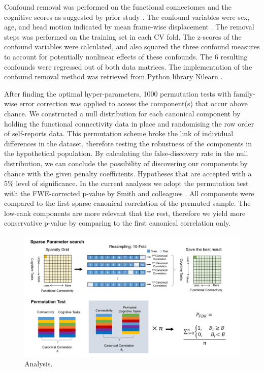 Confound removal was performed on the functional connectomes and the cognitive scores as suggested by prior study \cite{Smith2015}.
The confound variables were sex, age, and head motion indicated by mean frame-wise displacement \cite{Jenkinson2002}.
The  removal  steps  was  performed  on  the training set in each CV fold. The z-scores of the confound variables were calculated, and also squared the three confound measures to account for potentially nonlinear effects of these confounds. The 6 resulting confounds were regressed out of both data matrices.
The implementation of the confound removal method \cite{Friston1994} was retrieved from Python library Nilearn \cite[ \url{http://nilearn.github.io/}, version 0.3.1]{Abraham2014}.

After finding the optimal hyper-parameters, 1000 permutation tests with family-wise error correction was applied to access the component(s) that occur above chance. We constructed a null distribution for each canonical component by holding the functional connectivity data in place and randomising the row order of self-reports data. This permutation scheme broke the link of individual differences in the dataset, therefore testing the robustness of the components in the hypothetical population. By calculating the false-discovery rate in the null distribution, we can conclude the possibility of discovering our components by chance with the given penalty coefficients. Hypotheses that are accepted with a 5\% level of significance. In the current analyses we adopt the permutation test with the FWE-corrected p-value by Smith and colleagues \citeyear{Smith2015}. All components were compared to the first sparse canonical correlation of the permuted sample. The low-rank components are more relevant that the rest, therefore we yield more conservative p-value by comparing to the first canonical correlation only.

\begin{figure}[H]
	\centering
	\includegraphics[width=1\textwidth]{study3/image/study3fig1.png}
	\caption{Analysis.}
	\label{fig:study3:fig1}
\end{figure}

